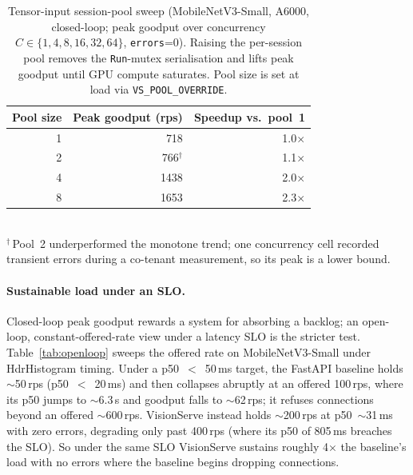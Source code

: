 \begin{table}[t]
  \centering
  \small
  \caption{%
    Tensor-input session-pool sweep (MobileNetV3-Small, A6000, closed-loop; peak goodput over
    concurrency $C\in\{1,4,8,16,32,64\}$, \texttt{errors}=0).  Raising the per-session pool
    removes the \texttt{Run}-mutex serialisation and lifts peak goodput until GPU compute
    saturates.  Pool size is set at load via \texttt{VS\_POOL\_OVERRIDE}.%
  }
  \label{tab:pool}
  \begin{tabular}{rrr}
    \toprule
    \textbf{Pool size} & \textbf{Peak goodput (rps)} & \textbf{Speedup vs.\ pool~1} \\
    \midrule
    1 & 718              & 1.0$\times$ \\
    2 & 766$^{\dagger}$  & 1.1$\times$ \\
    4 & 1438             & 2.0$\times$ \\
    8 & 1653             & 2.3$\times$ \\
    \bottomrule
  \end{tabular}
  \\[2pt]
  {\footnotesize $^{\dagger}$\,Pool~2 underperformed the monotone trend; one concurrency cell
  recorded transient errors during a co-tenant measurement, so its peak is a lower bound.}
\end{table}

\paragraph{Sustainable load under an SLO.}
Closed-loop peak goodput rewards a system for absorbing a backlog; an open-loop,
constant-offered-rate view under a latency SLO is the stricter test.
Table~\ref{tab:openloop} sweeps the offered rate on MobileNetV3-Small under HdrHistogram
timing.  Under a p50~$<$~50\,ms target, the FastAPI baseline holds $\sim$50\,rps
(p50~$<$~20\,ms) and then collapses abruptly at an offered 100\,rps, where its p50
jumps to $\sim$6.3\,s and goodput falls to $\sim$62\,rps; it refuses connections beyond an
offered $\sim$600\,rps.  VisionServe instead holds $\sim$200\,rps at p50~$\sim$31\,ms with
zero errors, degrading only past 400\,rps (where its p50 of 805\,ms breaches the SLO).  So
under the same SLO VisionServe sustains roughly 4$\times$ the baseline's load with no errors
where the baseline begins dropping connections.

